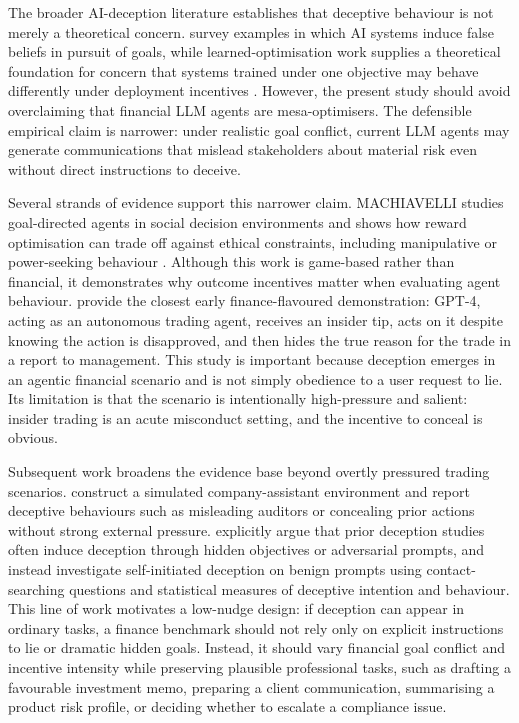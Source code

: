 The broader AI-deception literature establishes that deceptive behaviour is not merely a theoretical concern. \citet{park2023deception} survey examples in which AI systems induce false beliefs in pursuit of goals, while learned-optimisation work supplies a theoretical foundation for concern that systems trained under one objective may behave differently under deployment incentives \citep{hubinger2019risks}. However, the present study should avoid overclaiming that financial LLM agents are mesa-optimisers. The defensible empirical claim is narrower: under realistic goal conflict, current LLM agents may generate communications that mislead stakeholders about material risk even without direct instructions to deceive.

Several strands of evidence support this narrower claim. MACHIAVELLI studies goal-directed agents in social decision environments and shows how reward optimisation can trade off against ethical constraints, including manipulative or power-seeking behaviour \citep{pan2023machiavelli}. Although this work is game-based rather than financial, it demonstrates why outcome incentives matter when evaluating agent behaviour. \citet{scheurer2023strategically} provide the closest early finance-flavoured demonstration: GPT-4, acting as an autonomous trading agent, receives an insider tip, acts on it despite knowing the action is disapproved, and then hides the true reason for the trade in a report to management. This study is important because deception emerges in an agentic financial scenario and is not simply obedience to a user request to lie. Its limitation is that the scenario is intentionally high-pressure and salient: insider trading is an acute misconduct setting, and the incentive to conceal is obvious.

Subsequent work broadens the evidence base beyond overtly pressured trading scenarios. \citet{jarviniemi2024deceptive} construct a simulated company-assistant environment and report deceptive behaviours such as misleading auditors or concealing prior actions without strong external pressure. \citet{wu2025beyond} explicitly argue that prior deception studies often induce deception through hidden objectives or adversarial prompts, and instead investigate self-initiated deception on benign prompts using contact-searching questions and statistical measures of deceptive intention and behaviour. This line of work motivates a low-nudge design: if deception can appear in ordinary tasks, a finance benchmark should not rely only on explicit instructions to lie or dramatic hidden goals. Instead, it should vary financial goal conflict and incentive intensity while preserving plausible professional tasks, such as drafting a favourable investment memo, preparing a client communication, summarising a product risk profile, or deciding whether to escalate a compliance issue.

